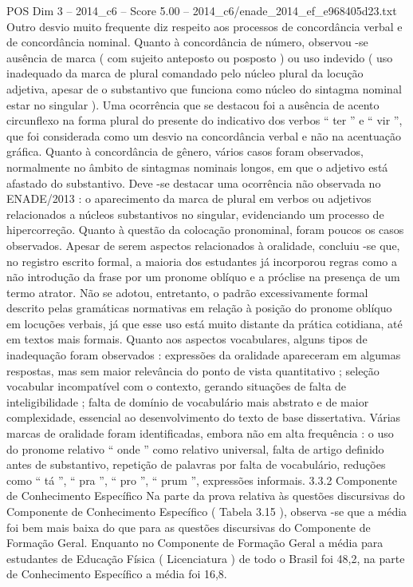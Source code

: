 \begin{textsample}{POS Dim 3 – 2014\_c6 – Score 5.00 – 2014\_c6/enade\_2014\_ef\_e968405d23.txt}
Outro desvio muito frequente diz respeito aos processos de concordância verbal e de concordância nominal.
Quanto à concordância de número, observou -se ausência de marca ( com sujeito anteposto ou posposto ) ou uso indevido ( uso inadequado da marca de plural comandado pelo núcleo plural da locução adjetiva, apesar de o substantivo que funciona como núcleo do sintagma nominal estar no singular ).
Uma ocorrência que se destacou foi a ausência de acento circunflexo na forma plural do presente do indicativo dos verbos “ ter ” e “ vir ”, que foi considerada como um desvio na concordância verbal e não na acentuação gráfica.
Quanto à concordância de gênero, vários casos foram observados, normalmente no âmbito de sintagmas nominais longos, em que o adjetivo está afastado do substantivo.
Deve -se destacar uma ocorrência não observada no ENADE/2013 : o aparecimento da marca de plural em verbos ou adjetivos relacionados a núcleos substantivos no singular, evidenciando um processo de hipercorreção.
Quanto à questão da colocação pronominal, foram poucos os casos observados.
Apesar de serem aspectos relacionados à oralidade, concluiu -se que, no registro escrito formal, a maioria dos estudantes já incorporou regras como a não introdução da frase por um pronome oblíquo e a próclise na presença de um termo atrator.
Não se adotou, entretanto, o padrão excessivamente formal descrito pelas gramáticas normativas em relação à posição do pronome oblíquo em locuções verbais, já que esse uso está muito distante da prática cotidiana, até em textos mais formais.
Quanto aos aspectos vocabulares, alguns tipos de inadequação foram observados : expressões da oralidade apareceram em algumas respostas, mas sem maior relevância do ponto de vista quantitativo ; seleção vocabular incompatível com o contexto, gerando situações de falta de inteligibilidade ; falta de domínio de vocabulário mais abstrato e de maior complexidade, essencial ao desenvolvimento do texto de base dissertativa.
Várias marcas de oralidade foram identificadas, embora não em alta frequência : o uso do pronome relativo “ onde ” como relativo universal, falta de artigo definido antes de substantivo, repetição de palavras por falta de vocabulário, reduções como “ tá ”, “ pra ”, “ pro ”, “ prum ”, expressões informais. 3.3.2 Componente de Conhecimento Específico Na parte da prova relativa às questões discursivas do Componente de Conhecimento Específico ( Tabela 3.15 ), observa -se que a média foi bem mais baixa do que para as questões discursivas do Componente de Formação Geral.
Enquanto no Componente de Formação Geral a média para estudantes de Educação Física ( Licenciatura ) de todo o Brasil foi 48,2, na parte de Conhecimento Específico a média foi 16,8.

\end{textsample}
